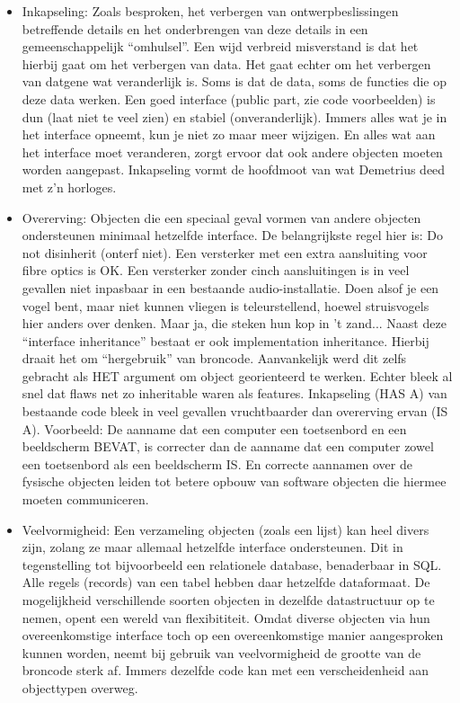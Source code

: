 \documentclass[a4paper,10pt]{article}
\begin{document}
\begin{itemize}

\item Inkapseling: Zoals besproken, het verbergen van ontwerpbeslissingen betreffende details en het onderbrengen van deze details in een gemeenschappelijk ``omhulsel''.
Een wijd verbreid misverstand is dat het hierbij gaat om het verbergen van data.
Het gaat echter om het verbergen van datgene wat veranderlijk is.
Soms is dat de data, soms de functies die op deze data werken.
Een goed interface (public part, zie code voorbeelden) is dun (laat niet te veel zien) en stabiel (onveranderlijk).
Immers alles wat je in het interface opneemt, kun je niet zo maar meer wijzigen.
En alles wat aan het interface moet veranderen, zorgt ervoor dat ook andere objecten moeten worden aangepast.
Inkapseling vormt de hoofdmoot van wat Demetrius deed met z'n horloges.

\item Overerving: Objecten die een speciaal geval vormen van andere objecten ondersteunen minimaal hetzelfde interface.
De belangrijkste regel hier is: Do not disinherit (onterf niet).
Een versterker met een extra aansluiting voor fibre optics is OK.
Een versterker zonder cinch aansluitingen is in veel gevallen niet inpasbaar in een bestaande audio-installatie.
Doen alsof je een vogel bent, maar niet kunnen vliegen is teleurstellend, hoewel struisvogels hier anders over denken.
Maar ja, die steken hun kop in 't zand...
Naast deze ``interface inheritance'' bestaat er ook implementation inheritance.
Hierbij draait het om ``hergebruik'' van broncode.
Aanvankelijk werd dit zelfs gebracht als HET argument om object georienteerd te werken.
Echter bleek al snel dat flaws net zo inheritable waren als features.
Inkapseling (HAS A) van bestaande code bleek in veel gevallen vruchtbaarder dan overerving ervan (IS A).
Voorbeeld: De aanname dat een computer een toetsenbord en een beeldscherm BEVAT, is correcter dan de aanname dat een computer zowel een toetsenbord als een beeldscherm IS.
En correcte aannamen over de fysische objecten leiden tot betere opbouw van software objecten die hiermee moeten communiceren.

\item Veelvormigheid: Een verzameling objecten (zoals een lijst) kan heel divers zijn, zolang ze maar allemaal hetzelfde interface ondersteunen.
Dit in tegenstelling tot bijvoorbeeld een relationele database, benaderbaar in SQL.
Alle regels (records) van een tabel hebben daar hetzelfde dataformaat.
De mogelijkheid verschillende soorten objecten in dezelfde datastructuur op te nemen, opent een wereld van flexibititeit.
Omdat diverse objecten via hun overeenkomstige interface toch op een overeenkomstige manier aangesproken kunnen worden,
neemt bij gebruik van veelvormigheid de grootte van de broncode sterk af.
Immers dezelfde code kan met een verscheidenheid aan objecttypen overweg.

\end{itemize}
\end{document}
